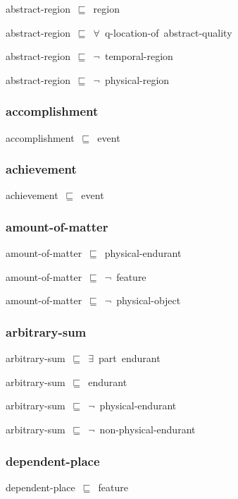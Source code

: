 \documentclass{article}
\begin{document}
abstract-region~\ensuremath{\sqsubseteq}~region~

abstract-region~\ensuremath{\sqsubseteq}~\ensuremath{\forall}~q-location-of~abstract-quality~

abstract-region~\ensuremath{\sqsubseteq}~\ensuremath{\lnot}~temporal-region

abstract-region~\ensuremath{\sqsubseteq}~\ensuremath{\lnot}~physical-region

\subsubsection*{accomplishment}

accomplishment~\ensuremath{\sqsubseteq}~event~

\subsubsection*{achievement}

achievement~\ensuremath{\sqsubseteq}~event~

\subsubsection*{amount-of-matter}

amount-of-matter~\ensuremath{\sqsubseteq}~physical-endurant~

amount-of-matter~\ensuremath{\sqsubseteq}~\ensuremath{\lnot}~feature

amount-of-matter~\ensuremath{\sqsubseteq}~\ensuremath{\lnot}~physical-object

\subsubsection*{arbitrary-sum}

arbitrary-sum~\ensuremath{\sqsubseteq}~\ensuremath{\exists}~part~endurant~

arbitrary-sum~\ensuremath{\sqsubseteq}~endurant~

arbitrary-sum~\ensuremath{\sqsubseteq}~\ensuremath{\lnot}~physical-endurant

arbitrary-sum~\ensuremath{\sqsubseteq}~\ensuremath{\lnot}~non-physical-endurant

\subsubsection*{dependent-place}

dependent-place~\ensuremath{\sqsubseteq}~feature~
\end{document}
